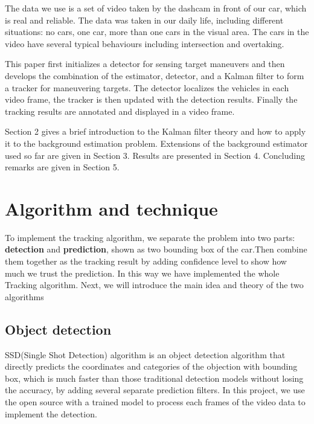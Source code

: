\documentclass[10pt,twocolumn,letterpaper]{article}
\begin{document}
The data we use is a set of video taken by the dashcam in front of our car, which is real and reliable. The data was taken in our daily life, including different situations: no cars, one car, more than one cars in the visual area. The cars in the video have several typical behaviours including intersection and overtaking.

This paper first initializes a detector for sensing target maneuvers and then develops the combination of the estimator, detector, and a Kalman filter to form a tracker for maneuvering targets. The detector localizes the vehicles in each video frame, the tracker is then updated with the detection results. Finally the tracking results are annotated and displayed in a video frame.

Section 2 gives a brief introduction to the Kalman filter theory
and how to apply it to the background estimation problem.
Extensions of the background estimator used so far are given
in Section 3. Results are presented in Section 4. Concluding
remarks are given in Section 5.

\section{Algorithm and technique}

To implement the tracking algorithm, we separate the problem into two parts: \textbf{detection} and \textbf{prediction}, shown as two bounding box of the car.Then combine them together as the tracking result by adding confidence level to show how much we trust the prediction. In this way we have implemented the whole Tracking algorithm. Next, we will introduce the main idea and theory of the two algorithms

\subsection{Object detection}

SSD(Single Shot Detection) algorithm is an object detection algorithm that directly predicts the coordinates and categories of the objection with bounding box, which is much faster than those traditional detection models without losing the accuracy, by adding several separate prediction filters. In this project, we use the open source with a trained model to process each frames of the video data to implement the detection.
\end{document}
